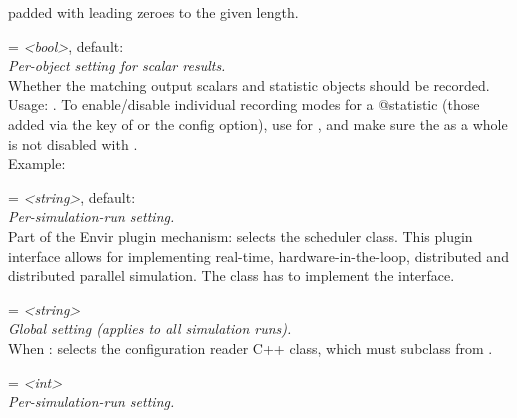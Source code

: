 \begin{description}
    padded with leading zeroes to the given length.
\item[**.scalar-recording] = \textit{<bool>}, default: \\
    \textit{Per-object setting for scalar results.}\\
    Whether the matching output scalars and statistic objects should be
    recorded.\\
    Usage:
    .
    To enable/disable individual recording modes for a @statistic (those added
    via the  key of
     or the
    config option), use 
    for , and make sure the
     as a whole is not disabled with
    .\\
    Example:
\item[scheduler-class] = \textit{<string>}, default: \\
    \textit{Per-simulation-run setting.}\\
    Part of the Envir plugin mechanism: selects the scheduler class. This
    plugin interface allows for implementing real-time, hardware-in-the-loop,
    distributed and distributed parallel simulation. The class has to implement
    the  interface.
\item[sectionbasedconfig-configreader-class] = \textit{<string>}\\
    \textit{Global setting (applies to all simulation runs).}\\
    When
    :
    selects the configuration reader C++ class, which must subclass from
    .
\item[seed-\%-lcg32] = \textit{<int>}\\
    \textit{Per-simulation-run setting.}\\

\end{description}
